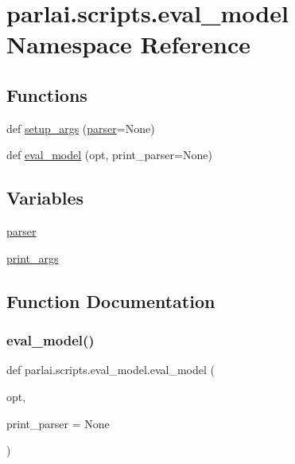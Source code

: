 \hypertarget{namespaceparlai_1_1scripts_1_1eval__model}{}\section{parlai.\+scripts.\+eval\+\_\+model Namespace Reference}
\label{namespaceparlai_1_1scripts_1_1eval__model}
\subsection*{Functions}
\begin{DoxyCompactItemize}
\item 
def \hyperlink{namespaceparlai_1_1scripts_1_1eval__model_a2eaba0aa76c4d83e2a0f7f77c23479c8}{setup\+\_\+args} (\hyperlink{namespaceparlai_1_1scripts_1_1eval__model_add6748e40c9e6791f7189d2d48cba31a}{parser}=None)
\item 
def \hyperlink{namespaceparlai_1_1scripts_1_1eval__model_ade1dfda1be70776553a1fbd6a3450c40}{eval\+\_\+model} (opt, print\+\_\+parser=None)
\end{DoxyCompactItemize}
\subsection*{Variables}
\begin{DoxyCompactItemize}
\item 
\hyperlink{namespaceparlai_1_1scripts_1_1eval__model_add6748e40c9e6791f7189d2d48cba31a}{parser}
\item 
\hyperlink{namespaceparlai_1_1scripts_1_1eval__model_a4a8ca10054cd72a43598c93620adc4ff}{print\+\_\+args}
\end{DoxyCompactItemize}


\subsection{Function Documentation}
\mbox{\label{namespaceparlai_1_1scripts_1_1eval__model_ade1dfda1be70776553a1fbd6a3450c40}} 
\subsubsection{\texorpdfstring{eval\+\_\+model()}{eval\_model()}}
{\footnotesize\ttfamily def parlai.\+scripts.\+eval\+\_\+model.\+eval\+\_\+model (\begin{DoxyParamCaption}\item[{}]{opt,  }\item[{}]{print\+\_\+parser = {\ttfamily None} }\end{DoxyParamCaption})}

